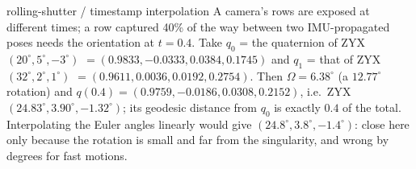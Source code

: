 \begin{example}{rolling-shutter / timestamp interpolation}
A camera's rows are exposed at different times; a row captured 40\% of the way between two IMU-propagated poses needs the orientation at $t=0.4$. Take $q_0$ = the quaternion of ZYX $(20^\circ,5^\circ,-3^\circ)$ $=(0.9833,-0.0333,0.0384,0.1745)$ and $q_1$ = that of ZYX $(32^\circ,2^\circ,1^\circ)$ $=(0.9611,0.0036,0.0192,0.2754)$. Then $\Omega=6.38^\circ$ (a $12.77^\circ$ rotation) and $q(0.4)=(0.9759,-0.0186,0.0308,0.2152)$, i.e.\ ZYX $(24.83^\circ,3.90^\circ,-1.32^\circ)$; its geodesic distance from $q_0$ is exactly $0.4$ of the total. Interpolating the Euler angles linearly would give $(24.8^\circ,3.8^\circ,-1.4^\circ)$: close here only because the rotation is small and far from the singularity, and wrong by degrees for fast motions.
\end{example}
